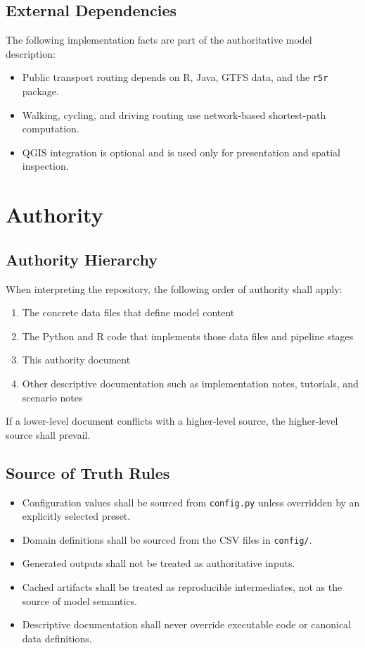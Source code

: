 \documentclass[11pt]{article}
\begin{document}
\subsection*{External Dependencies}

The following implementation facts are part of the authoritative model description:

\begin{itemize}
  \item Public transport routing depends on R, Java, GTFS data, and the \texttt{r5r} package.
  \item Walking, cycling, and driving routing use network-based shortest-path computation.
  \item QGIS integration is optional and is used only for presentation and spatial inspection.
\end{itemize}

\section{Authority}

\subsection*{Authority Hierarchy}

When interpreting the repository, the following order of authority shall apply:

\begin{enumerate}
  \item The concrete data files that define model content
  \item The Python and R code that implements those data files and pipeline stages
  \item This authority document
  \item Other descriptive documentation such as implementation notes, tutorials, and scenario notes
\end{enumerate}

If a lower-level document conflicts with a higher-level source, the higher-level source shall prevail.

\subsection*{Source of Truth Rules}

\begin{itemize}
  \item Configuration values shall be sourced from \texttt{config.py} unless overridden by an explicitly selected preset.
  \item Domain definitions shall be sourced from the CSV files in \texttt{config/}.
  \item Generated outputs shall not be treated as authoritative inputs.
  \item Cached artifacts shall be treated as reproducible intermediates, not as the source of model semantics.
  \item Descriptive documentation shall never override executable code or canonical data definitions.
\end{itemize}
\end{document}

